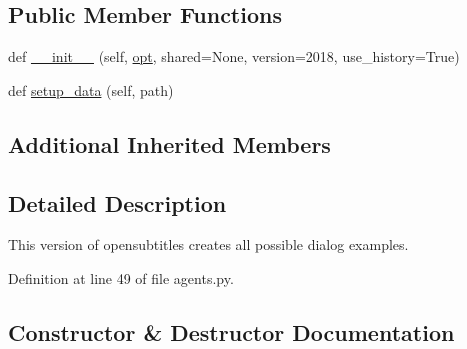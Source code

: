 \subsection*{Public Member Functions}
\begin{DoxyCompactItemize}
\item 
def \hyperlink{classparlai_1_1tasks_1_1opensubtitles_1_1agents_1_1FullTeacher_aadd6073a3a0cd25d780679e824fb0673}{\+\_\+\+\_\+init\+\_\+\+\_\+} (self, \hyperlink{classparlai_1_1core_1_1teachers_1_1FbDialogTeacher_af7a9ec497b9cd0292d7b8fa220da7c28}{opt}, shared=None, version=\textquotesingle{}2018\textquotesingle{}, use\+\_\+history=True)
\item 
def \hyperlink{classparlai_1_1tasks_1_1opensubtitles_1_1agents_1_1FullTeacher_abd9f716304f56c2b8b7f7573d34c87f6}{setup\+\_\+data} (self, path)
\end{DoxyCompactItemize}
\subsection*{Additional Inherited Members}


\subsection{Detailed Description}
\begin{DoxyVerb}This version of opensubtitles creates all possible dialog examples.
\end{DoxyVerb}
 

Definition at line 49 of file agents.\+py.



\subsection{Constructor \& Destructor Documentation}
\mbox{\label{classparlai_1_1tasks_1_1opensubtitles_1_1agents_1_1FullTeacher_aadd6073a3a0cd25d780679e824fb0673}} 
